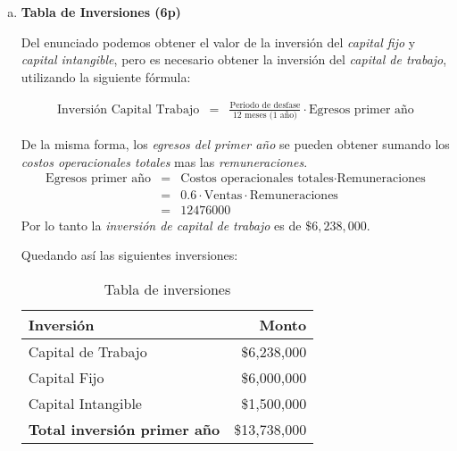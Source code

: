 \begin{enumerate}[(a)]
\newpage
    \item {\bf Tabla de Inversiones (6p)}


        Del enunciado podemos obtener el valor de la inversión del \emph{capital fijo} y \emph{capital intangible},
        pero es necesario obtener la inversión del \emph{capital de trabajo}, utilizando la siguiente fórmula:

        \begin{eqnarray}
            \text{Inversión Capital Trabajo} &=& \frac{\text{Periodo de desfase}}{\text{12 meses (1 año)}} \cdot \text{Egresos primer año}
        \end{eqnarray}

        De la misma forma,
        los \emph{egresos del primer año} se pueden obtener sumando los \emph{costos operacionales totales} mas las \emph{remuneraciones}.
        \begin{eqnarray}
            \text{Egresos primer año} &=& \text{Costos operacionales totales} \cdot \text{Remuneraciones} \\
                                      &=& 0.6\cdot  \text{Ventas} \cdot \text{Remuneraciones} \nonumber \\
                                      &=& 12476000 \nonumber
        \end{eqnarray}        
        Por lo tanto la \emph{inversión de capital de trabajo} es de $\$6,238,000$.

        Quedando así las siguientes inversiones:

        \begin{table}[h!t]
            \centering
            \begin{tabular}{|l|r|}
                \hline
                {\bf Inversión }   & {\bf Monto} \\ \hline
                Capital de Trabajo & \$6,238,000     \\ \hline
                Capital Fijo       & \$6,000,000     \\ \hline
                Capital Intangible & \$1,500,000     \\ \hline
                {\bf Total inversión primer año} & \$13,738,000 \\\hline
            \end{tabular}
            \caption{Tabla de inversiones}
            \label{tab:inversiones}
        \end{table}


\end{enumerate}
